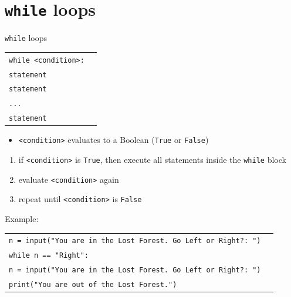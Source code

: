 \documentclass[t,handout,9pt]{beamer}
\begin{document}
\section{\texttt{while} loops}
\begin{frame}{\texttt{while} loops}
\vfill
\begin{table}[]
\begin{flushleft}
\begin{tabular}{ll}
\texttt{while <condition>:} &  \\
\texttt{\qquad statement}        & \\
\texttt{\qquad statement}        & \\
\texttt{\qquad ...}        & \\
\texttt{\qquad statement}        & \\
\end{tabular}
\end{flushleft}
\end{table}
\vfill
\begin{itemize}
	\item \texttt{<condition>} evaluates to a Boolean (\texttt{True} or \texttt{False})
\end{itemize}
\begin{enumerate}
	\item if \texttt{<condition>} is \texttt{True}, then execute all statements inside the \texttt{while} block
	\item evaluate \texttt{<condition>} again
	\item repeat until \texttt{<condition>} is \texttt{False}
\end{enumerate}
\vfill
\end{frame}
%
\begin{frame}
\vfill
Example:
\begin{table}[]
\begin{flushleft}
\begin{tabular}{ll}
\texttt{n = input("You are in the Lost Forest. Go Left or Right?: ")} &  \\
\texttt{while n == "Right":}        & \\
\texttt{\qquad n = input("You are in the Lost Forest. Go Left or Right?: ")}        & \\
\texttt{print("You are out of the Lost Forest.")}        & \\
\end{tabular}
\end{flushleft}
\end{table}
\vfill
\end{frame}
%
\end{document}
